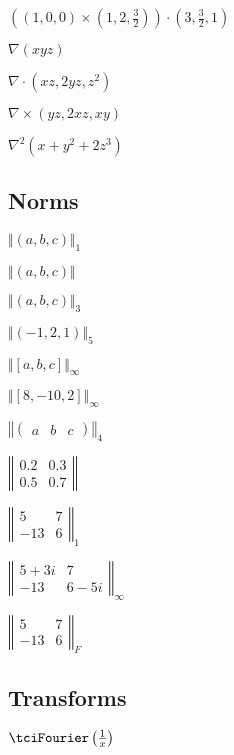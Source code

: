 \documentclass{article}
\begin{document}
$\left( \left( 1,0,0\right) \times \left( 1,2,\frac{3}{2}\right) \right)
\cdot \left( 3,\frac{3}{2},1\right) $

$\nabla \left( xyz\right) $

$\nabla \cdot (xz,2yz,z^{2})$

$\nabla \times (yz,2xz,xy)$

$\nabla ^{2}\left( x+y^{2}+2z^{3}\right) $

\subsection{Norms}

$\Vert \left( a,b,c\right) \Vert _{1}$

$\Vert \left( a,b,c\right) \Vert $

$\Vert \left( a,b,c\right) \Vert _{3}$

$\Vert \left( -1,2,1\right) \Vert _{5}$

$\Vert \left[ a,b,c\right] \Vert _{\infty }$

$\Vert \left[ 8,-10,2\right] \Vert _{\infty }$

$\left\Vert \left( 
\begin{array}{ccc}
a & b & c%
\end{array}%
\right) \right\Vert _{4}$

$\left\Vert 
\begin{array}{cc}
0.2 & 0.3 \\ 
0.5 & 0.7%
\end{array}%
\right\Vert $

$\left\Vert 
\begin{array}{cc}
5 & 7 \\ 
-13 & 6%
\end{array}%
\right\Vert _{1}$

$\left\Vert 
\begin{array}{cc}
5+3i & 7 \\ 
-13 & 6-5i%
\end{array}%
\right\Vert _{\infty }$

$\left\Vert 
\begin{array}{cc}
5 & 7 \\ 
-13 & 6%
\end{array}%
\right\Vert _{F}$

\subsection{Transforms}

$\tciFourier \left( \frac{1}{x}\right) $
\end{document}
